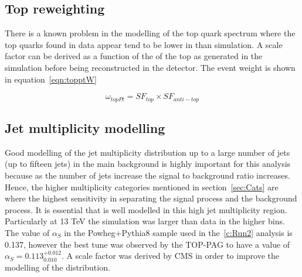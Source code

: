 \subsection{Top \pt reweighting}

There is a known problem in the modelling of the top quark \pt spectrum where the top quarks found in data appear tend to be lower in \pt than simulation. A scale factor can be derived as a function of the \pt of the top as generated in the simulation before being reconstructed in the detector. The event weight is shown in equation~\ref{eqn:topptW}

\begin{equation}
\omega_{topPt} = SF_{top}\times SF_{anti-top}
\label{eqn:topptW}
\end{equation}

\subsection{Jet multiplicity modelling}
Good modelling of the jet multiplicity distribution up to a large number of jets (up to fifteen jets) in the main \ttbar background is highly important for this analysis because as the number of jets increase the signal to background ratio increases. Hence, the higher \njets multiplicity categories mentioned in section~\ref{sec:Cats} are where the highest sensitivity in separating the signal \tttt process and the background \ttbar process. It is essential that \ttbar is well modelled in this high jet multiplicity region. 
Particularly at 13 TeV the simulation was larger than data in the higher \njets bins. The value of $\alpha_S$ in the \ttbar Powheg+Pythia8 sample used in the~\ref{c:Run2} analysis is 0.137, however the best tune was observed by the TOP-PAG to have a value of $\alpha_S=0.113^{+0.012}_{0.010}$. A scale factor was derived by CMS in order to improve the modelling of the \njets distribution. 

